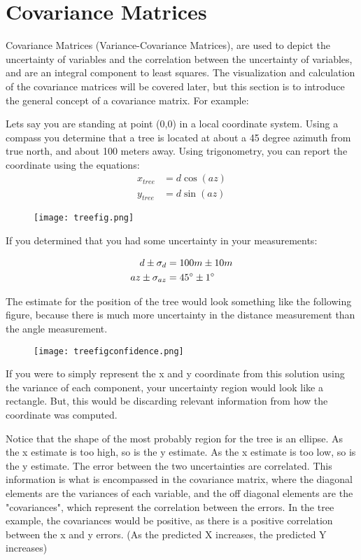 \section{Covariance Matrices}
Covariance Matrices (Variance-Covariance Matrices), are used to depict the uncertainty of variables and the correlation between the uncertainty of variables, and are an integral component to least squares.  The visualization and calculation of the covariance matrices will be covered later, but this section is to introduce the general concept of a covariance matrix.  For example:

Lets say you are standing at point (0,0) in a local coordinate system.  Using a compass you determine that a tree is located at about a 45 degree azimuth from true north, and about 100 meters away.  Using trigonometry, you can report the coordinate using the equations:
\begin{align*}
x_{tree} &= d \cos(az) \\
y_{tree} &= d \sin(az)
\end{align*}

\begin{figure}[H]
	\centering
	\texttt{[image: treefig.png]}
\end{figure}

If you determined that you had some uncertainty in your measurements:

\begin{align*}
d \pm \sigma_d &= 100m \pm 10m \\
az \pm \sigma_{az} &= 45\degree  \pm 1\degree
\end{align*}

The estimate for the position of the tree would look something like the following figure, because there is much more uncertainty in the distance measurement than the angle measurement.

\begin{figure}[H]
	\centering
	\texttt{[image: treefigconfidence.png]}
\end{figure}

If you were to simply represent the x and y coordinate from this solution using the variance of each component, your uncertainty region would look like a rectangle.  But, this would be discarding relevant information from how the coordinate was computed.

Notice that the shape of the most probably region for the tree is an ellipse.  As the x estimate is too high, so is the y estimate.  As the x estimate is too low, so is the y estimate.  The error between the two uncertainties are correlated.  This information is what is encompassed in the covariance matrix, where the diagonal elements are the variances of each variable, and the off diagonal elements are the "covariances", which represent the correlation between the errors.  In the tree example, the covariances would be positive, as there is a positive correlation between the x and y errors.  (As the predicted X increases, the predicted Y increases)

